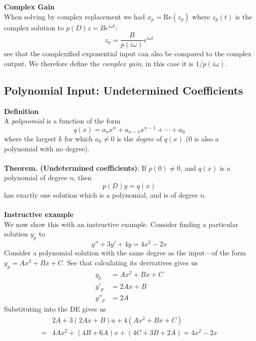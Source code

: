 \documentclass{report}
\begin{document}
\textbf{Complex Gain}\\
When solving by complex replacement we had $x_p=\text{Re}(z_p)$ where $z_p(t)$ is the complex solution
to $p(D)z=Be^{i\omega t}$:
\begin{equation*}
z_p=\frac{B}{p(i\omega)}e^{i\omega t}
\end{equation*}
see that the complexified exponential input can also be compared to the complex output. We therefore define the 
\textit{complex gain}, in this case it is $1/p(i\omega)$.
\newpage

\subsection{Polynomial Input: Undetermined Coefficients}
\textbf{Definition}\\
A \textit{polynomial} is a function of the form
\begin{equation*}
q(x)=a_nx^n+a_{n-1}x^{n-1}+\cdots+a_0
\end{equation*}
where the largest $k$ for which $a_k\neq0$ is the \textit{degree} of $q(x)$ (0 is also a polynomial with no degree).
\\
\vspace{1mm}\\
\textbf{Theorem. (Undetermined coefficients)}: If $p(0)\neq
0$, and $q(x)$ is a polynomial of degree $n$, then
\begin{equation*}
p(D)y=q(x)
\end{equation*}
has exactly one solution which is a polynomial, and is of degree $n$.\\
\vspace{1mm}\\
\textbf{Instructive example}\\
We now show this with an instructive example. Consider
finding a particular solution $y_p$ to
\begin{equation*}
y''+3y'+4y=4x^2-2x
\end{equation*}
Consider a polynomial solution with the same degree as the input---of the form $y_p=Ax^2+Bx+C$. See that
calculating its derivatives gives us
\begin{align*}
y_p&=Ax^2+Bx+C\\
y'_p&=2Ax+B\\
y''_p&=2A
\end{align*}
Substituting into the DE gives us
\begin{align*}
&2A+3(2Ax+B)a+4(Ax^2+Bx+C)\\
=&4Ax^2+(4B+6A)x+(4C+3B+2A)=4x^2-2x
\end{align*}
\end{document}
